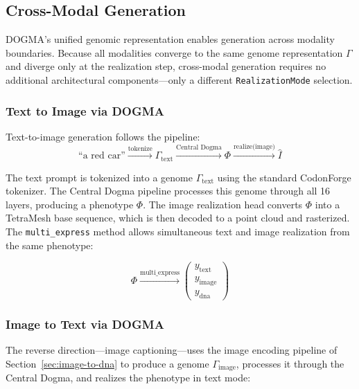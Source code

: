 \subsection{Cross-Modal Generation}
\label{sec:cross-modal-gen}

DOGMA's unified genomic representation enables generation across modality boundaries. Because all modalities converge to the same genome representation $\Gamma$ and diverge only at the realization step, cross-modal generation requires no additional architectural components---only a different \texttt{RealizationMode} selection.

\subsubsection{Text to Image via DOGMA}

Text-to-image generation follows the pipeline:
\begin{equation}
\text{``a red car''} \xrightarrow{\text{tokenize}} \Gamma_{\text{text}} \xrightarrow{\text{Central Dogma}} \Phi \xrightarrow{\text{realize(image)}} \hat{I}
\label{eq:text-to-image}
\end{equation}

The text prompt is tokenized into a genome $\Gamma_{\text{text}}$ using the standard CodonForge tokenizer. The Central Dogma pipeline processes this genome through all 16 layers, producing a phenotype $\Phi$. The image realization head converts $\Phi$ into a TetraMesh base sequence, which is then decoded to a point cloud and rasterized. The \texttt{multi\_express} method allows simultaneous text and image realization from the same phenotype:

\begin{equation}
\Phi \xrightarrow{\text{multi\_express}} \begin{pmatrix} y_{\text{text}} \\ y_{\text{image}} \\ y_{\text{dna}} \end{pmatrix}
\label{eq:multi-express-image}
\end{equation}

\subsubsection{Image to Text via DOGMA}

The reverse direction---image captioning---uses the image encoding pipeline of Section~\ref{sec:image-to-dna} to produce a genome $\Gamma_{\text{image}}$, processes it through the Central Dogma, and realizes the phenotype in text mode:

